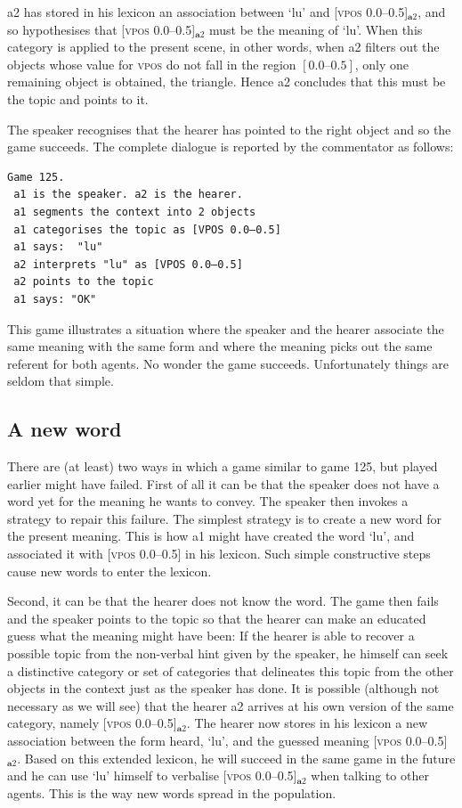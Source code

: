 {\bfshape a2} has stored in his lexicon an
association between `lu' and [\textsc{vpos} 0.0–0.5]$_{\mathbf  a2}$, and so
hypothesises that [\textsc{vpos} 0.0–0.5]$_{\mathbf  a2}$ must be the meaning of `lu'. 
When this category is applied to the present scene, in other words,
when {\bfshape a2} filters out the objects whose value for \textsc{vpos} do not 
fall in the region $[0.0–0.5]$, only one 
remaining object is obtained, the triangle. Hence {\bfshape a2} concludes that 
this must be the topic and points to it. 

The speaker recognises that the hearer has pointed
to the right object and so the game succeeds. The complete
dialogue is reported by the commentator as follows: 
\begin{verbatim}
Game 125.
 a1 is the speaker. a2 is the hearer. 
 a1 segments the context into 2 objects
 a1 categorises the topic as [VPOS 0.0–0.5]
 a1 says:  "lu"
 a2 interprets "lu" as [VPOS 0.0–0.5]
 a2 points to the topic 
 a1 says: "OK" 
\end{verbatim}
This game illustrates a situation 
where the speaker and the hearer associate the same meaning
with the same form and where the meaning 
picks out the same referent for both agents. No wonder
the game succeeds. Unfortunately things are seldom that simple. 

\subsection{A new word}

There are (at least) two ways in which a game similar to game 125, 
but played earlier might have failed. First of all it can be that
the speaker does not have a word yet for the meaning he wants
to convey. The speaker then invokes a strategy 
to repair this failure. The simplest strategy is to 
create a new word for the present meaning. This is how 
{\bfshape a1} might have created the word `lu', and associated it 
with [\textsc{vpos} 0.0–0.5] in his lexicon. Such simple constructive steps cause
new words to enter the lexicon. 

Second, it can be that the hearer does not know the word. The 
game then fails and the speaker points to 
the topic so that the hearer can make 
an educated guess what the meaning might have been:
If the hearer is able to recover a possible topic
from the non-verbal hint given by the speaker, 
he himself can seek a distinctive category or set of categories 
that delineates this topic from the other objects in 
the context just as the speaker has done. It is 
possible (although not necessary as we will see)
that the hearer {\bfshape a2} arrives at his 
own version of the same category, namely [\textsc{vpos} 0.0–0.5]$_{\mathbf  a2}$. The 
hearer now stores in his lexicon a new association between the 
form heard, `lu', and the guessed meaning [\textsc{vpos} 0.0–0.5]$_{\mathbf  a2}$. 
Based on this extended lexicon, he will succeed in the same game 
in the future and he can use `lu' himself to verbalise [\textsc{vpos} 0.0–0.5]$_{\mathbf  a2}$
when talking to other agents. This is the way new words
spread in the population.

